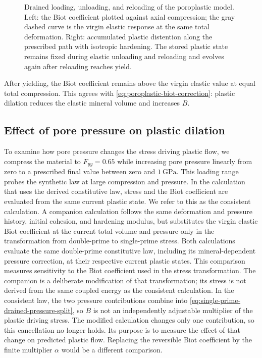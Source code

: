 \begin{figure}[ht]
 \centering
 \caption{Drained loading, unloading, and reloading of the poroplastic model.  Left: the Biot coefficient plotted against axial compression; the
 gray dashed curve is the virgin elastic response at the same total deformation.
 Right: accumulated plastic distention along the prescribed path with
 isotropic hardening. The stored
 plastic state remains fixed during elastic unloading and reloading and evolves again after reloading
 reaches yield.}
 \label{fig:implicit-poroplastic-history}
\end{figure}

After yielding, the Biot coefficient remains above the virgin elastic value
at equal total compression.  This agrees with \eqref{eq:poroplastic-biot-correction}:
plastic dilation reduces the elastic mineral volume and increases \(B\).

\subsection{Effect of pore pressure on plastic dilation}
\label{sec:poroplastic-b-feedback}

To examine how pore pressure changes the stress driving plastic flow, we compress the material to \(F_{yy}=0.65\)
while increasing pore pressure linearly from zero to a prescribed final
value between zero and \(1\ \mathrm{GPa}\).  This loading range probes the
synthetic law at large compression and pressure.  In the calculation that
uses the derived constitutive law, stress and the Biot coefficient are
evaluated from the same current plastic state.  We refer to this as the
consistent calculation.  A companion calculation follows the
same deformation and pressure history, initial cohesion, and hardening modulus,
but substitutes the virgin elastic Biot coefficient at the current total volume
and pressure only in the transformation from double-prime to single-prime
stress.  Both calculations evaluate the same double-prime constitutive law,
including its mineral-dependent pressure correction, at their respective
current plastic states.  This comparison measures sensitivity to the
Biot coefficient used in the stress transformation.  The companion is a deliberate
modification of that transformation; its stress is not derived from the same
coupled energy as the consistent calculation.
In the consistent law, the two pressure contributions combine into
\eqref{eq:single-prime-drained-pressure-split}, so \(B\) is not an
independently adjustable multiplier of the plastic driving stress.  The modified calculation changes only one contribution, so this
cancellation no longer holds.  Its purpose is to measure the effect of that
change on predicted plastic flow.  Replacing the reversible Biot coefficient by
the finite multiplier \(\alpha\) would be a different comparison.

